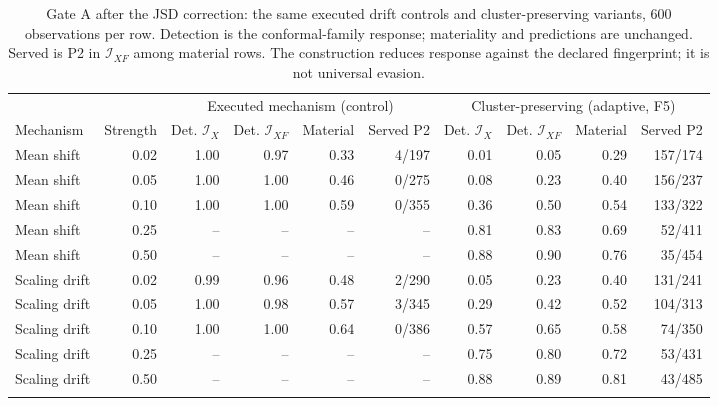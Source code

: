 \begin{table}[!tbp]
\caption{Gate A after the JSD correction: the same executed drift controls and cluster-preserving variants, 600 observations per row. Detection is the conformal-family response; materiality and predictions are unchanged. Served is P2 in $\mathcal I_{XF}$ among material rows. The construction reduces response against the declared fingerprint; it is not universal evasion.}
\label{tab:adversarial}
\centering\scriptsize\setlength{\tabcolsep}{4pt}
\begin{tabular}{@{}lrrrrrrrrr@{}}
\toprule
 & & \multicolumn{4}{c}{Executed mechanism (control)} & \multicolumn{4}{c}{Cluster-preserving (adaptive, F5)} \\
\cmidrule(lr){3-6}\cmidrule(lr){7-10}
Mechanism & Strength & Det. $\mathcal I_X$ & Det. $\mathcal I_{XF}$ & Material & Served P2 & Det. $\mathcal I_X$ & Det. $\mathcal I_{XF}$ & Material & Served P2 \\
\midrule
Mean shift & 0.02 & 1.00 & 0.97 & 0.33 & 4/197 & 0.01 & 0.05 & 0.29 & 157/174 \\
Mean shift & 0.05 & 1.00 & 1.00 & 0.46 & 0/275 & 0.08 & 0.23 & 0.40 & 156/237 \\
Mean shift & 0.10 & 1.00 & 1.00 & 0.59 & 0/355 & 0.36 & 0.50 & 0.54 & 133/322 \\
Mean shift & 0.25 & -- & -- & -- & -- & 0.81 & 0.83 & 0.69 & 52/411 \\
Mean shift & 0.50 & -- & -- & -- & -- & 0.88 & 0.90 & 0.76 & 35/454 \\
\addlinespace[1pt]
Scaling drift & 0.02 & 0.99 & 0.96 & 0.48 & 2/290 & 0.05 & 0.23 & 0.40 & 131/241 \\
Scaling drift & 0.05 & 1.00 & 0.98 & 0.57 & 3/345 & 0.29 & 0.42 & 0.52 & 104/313 \\
Scaling drift & 0.10 & 1.00 & 1.00 & 0.64 & 0/386 & 0.57 & 0.65 & 0.58 & 74/350 \\
Scaling drift & 0.25 & -- & -- & -- & -- & 0.75 & 0.80 & 0.72 & 53/431 \\
Scaling drift & 0.50 & -- & -- & -- & -- & 0.88 & 0.89 & 0.81 & 43/485 \\
\addlinespace[1pt]
\bottomrule
\end{tabular}
\end{table}
